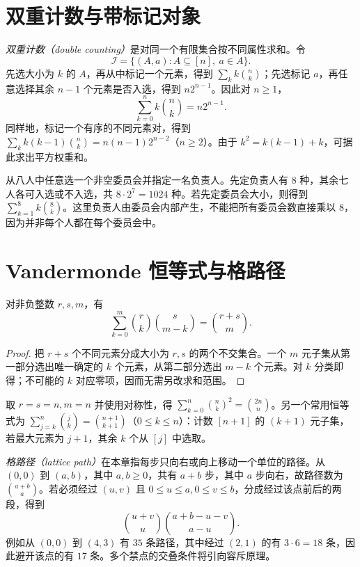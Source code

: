 \section{双重计数与带标记对象}

\emph{双重计数（double counting）}是对同一个有限集合按不同属性求和。令
\[
  \mathcal I=\{(A,a):A\subseteq[n],\ a\in A\}.
\]
先选大小为 $k$ 的 $A$，再从中标记一个元素，得到 $\sum_k k\binom nk$；先选标记 $a$，再任意选择其余 $n-1$ 个元素是否入选，得到 $n2^{n-1}$。因此对 $n\ge1$，
\begin{equation}
  \sum_{k=0}^n k\binom nk=n2^{n-1}.
  \label{eq:marked-subsets}
\end{equation}
同样地，标记一个有序的不同元素对，得到 $\sum_k k(k-1)\binom nk=n(n-1)2^{n-2}$（$n\ge2$）。由于 $k^2=k(k-1)+k$，可据此求出平方权重和。

\begin{example}
从八人中任意选一个非空委员会并指定一名负责人。先定负责人有 $8$ 种，其余七人各可入选或不入选，共 $8\cdot2^7=1024$ 种。若先定委员会大小，则得到 $\sum_{k=1}^8 k\binom8k$。这里负责人由委员会内部产生，不能把所有委员会数直接乘以 $8$，因为并非每个人都在每个委员会中。
\end{example}

\section{Vandermonde 恒等式与格路径}

\begin{theorem}
对非负整数 $r,s,m$，有
\begin{equation}
  \sum_{k=0}^{m}\binom rk\binom{s}{m-k}=\binom{r+s}{m}.
  \label{eq:vandermonde}
\end{equation}
\end{theorem}
\begin{proof}
把 $r+s$ 个不同元素分成大小为 $r,s$ 的两个不交集合。一个 $m$ 元子集从第一部分选出唯一确定的 $k$ 个元素，从第二部分选出 $m-k$ 个元素。对 $k$ 分类即得；不可能的 $k$ 对应零项，因而无需另改求和范围。
\end{proof}

取 $r=s=n,m=n$ 并使用对称性，得 $\sum_{k=0}^n\binom nk^2=\binom{2n}{n}$。另一个常用恒等式为 $\sum_{j=k}^n\binom jk=\binom{n+1}{k+1}$（$0\le k\le n$）：计数 $[n+1]$ 的 $(k+1)$ 元子集，若最大元素为 $j+1$，其余 $k$ 个从 $[j]$ 中选取。

\emph{格路径（lattice path）}在本章指每步只向右或向上移动一个单位的路径。从 $(0,0)$ 到 $(a,b)$，其中 $a,b\ge0$，共有 $a+b$ 步，其中 $a$ 步向右，故路径数为 $\binom{a+b}{a}$。若必须经过 $(u,v)$ 且 $0\le u\le a,0\le v\le b$，分成经过该点前后的两段，得到
\[
  \binom{u+v}{u}\binom{a+b-u-v}{a-u}.
\]
例如从 $(0,0)$ 到 $(4,3)$ 有 $35$ 条路径，其中经过 $(2,1)$ 的有 $3\cdot6=18$ 条，因此避开该点的有 $17$ 条。多个禁点的交叠条件将引向容斥原理。

